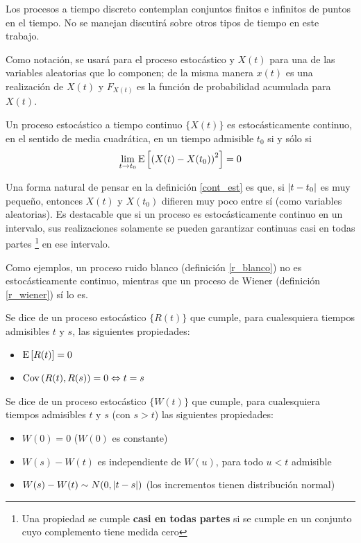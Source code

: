 Los procesos a tiempo discreto contemplan conjuntos finitos e infinitos de puntos en el tiempo.
No se manejan discutirá sobre otros tipos de tiempo en este trabajo.

Como notación, se usará \xt  para el proceso estocástico y $X(t)$ para una de las variables
aleatorias que lo componen; de la misma manera $x(t)$ es una realización de $X(t)$ y $F_{X(t)}$ 
es la función de probabilidad acumulada para $X(t)$.



\begin{definicion}
Un proceso estocástico a tiempo continuo $\{ X(t) \}$ es estocásticamente continuo, en el 
sentido de media cuadrática, en un tiempo admisible $t_0$ si y sólo si
\begin{equation*}
\lim_{t \rightarrow t_0} \mathrm{E}\left[ \left( X(t) - X(t_0) \right)^{2} \right] = 0
\end{equation*}
\label{cont_est}
\end{definicion}

Una forma natural de pensar en la definici\'on \ref{cont_est} es que, si $\left| t-t_0 \right|$ es muy 
peque\~no, entonces $X(t)$ y $X(t_0)$ difieren muy poco entre s\'i (como variables aleatorias).
Es destacable que si un proceso es estoc\'asticamente continuo en un intervalo, sus realizaciones 
solamente se pueden garantizar continuas casi en todas partes \footnote{Una propiedad se cumple 
\textbf{casi en todas partes} si se cumple en un conjunto cuyo complemento tiene medida cero} en 
ese intervalo.

Como ejemplos, un proceso ruido blanco (definici\'on \ref{r_blanco}) no es estoc\'asticamente 
continuo, mientras que un proceso de Wiener (definici\'on \ref{r_wiener}) s\'i lo es.

\begin{definicion}
Se dice de un proceso estoc\'astico $\{ R(t) \}$ que cumple, para cualesquiera tiempos admisibles
$t$ y $s$, las siguientes propiedades:
\begin{itemize}
\item $\mathrm{E}\left[ R(t) \right]=0$
\item $\mathrm{Cov}\left( R(t),R(s) \right)=0 \Leftrightarrow t=s$ 
\end{itemize}
\label{r_blanco}
\end{definicion}

\begin{definicion}
Se dice de un proceso estoc\'astico $\{ W(t) \}$ que cumple, para cualesquiera tiempos admisibles
$t$ y $s$ (con $s>t$) las siguientes propiedades:
\begin{itemize}
\item $W(0) = 0$ ($W(0)$ es constante)
\item $W(s)-W(t)$ es independiente de $W(u)$, para todo $u<t$ admisible
\item $W(s)-W(t) \sim N(0,\left| t-s \right|)$  (los incrementos tienen distribuci\'on normal)
\end{itemize}
\label{r_wiener}
\end{definicion}

